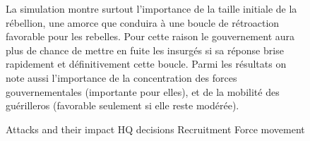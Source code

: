 \documentclass{article}
\begin{document}
\begin{center}
\begin{figure}[H]
\hfill
\begin{minipage}[H]{0.6\linewidth}
La simulation montre surtout l'importance de la taille initiale de la rébellion, une amorce que conduira à une boucle de rétroaction favorable pour les rebelles. Pour cette raison le gouvernement aura plus de chance de mettre en fuite les insurgés si sa réponse brise rapidement et définitivement cette boucle. Parmi les résultats on note aussi l'importance de la concentration des forces gouvernementales (importante pour elles), et de la mobilité des guérilleros (favorable seulement si elle reste modérée).
\end{minipage}
\hfill
\begin{minipage}[H]{0.3\linewidth}
\begin{algorithmic}[1]
			\STATE Attacks and their impact
			\STATE HQ decisions
			\STATE Recruitment
			\STATE Force movement
		\ENDWHILE
		\end{algorithmic}
\cite{doran2005iruba}
\end{minipage}
\hfill
\end{figure}
\end{center}
\end{document}
